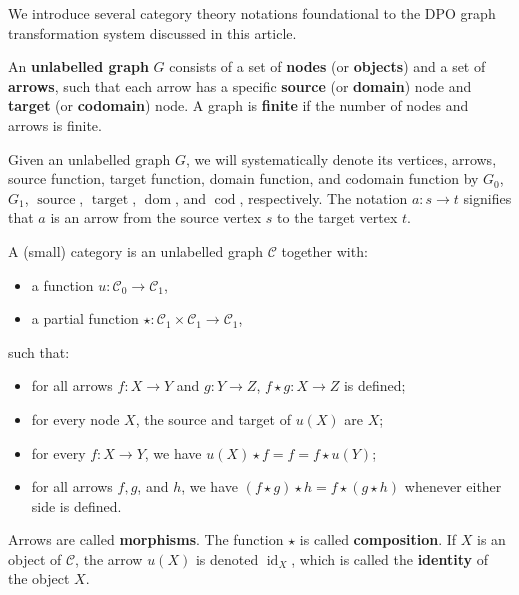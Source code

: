  We introduce several category theory notations foundational to the DPO graph transformation system discussed in this article.

\begin{definition} 
    An \textbf{unlabelled graph} \(G\) consists of a set of \textbf{nodes} (or \textbf{objects}) and a set of \textbf{arrows}, such that each arrow has a specific \textbf{source} (or \textbf{domain}) node and \textbf{target} (or \textbf{codomain}) node. A graph is \textbf{finite} if the number of nodes and arrows is finite.

    Given an unlabelled graph \(G\), we will systematically denote its vertices, arrows, source function, target function, domain function, and codomain function by \(G_0\), \(G_1\), \(\operatorname{source}\), \(\operatorname{target}\), \(\operatorname{dom}\), and \(\operatorname{cod}\), respectively. The notation \(a: s \mathop{\to} t\) signifies that \(a\) is an arrow from the source vertex \(s\) to the target vertex \(t\).
\end{definition}

\begin{definition}
    A (small) category is an unlabelled graph \(\mathcal{C}\) together with:
    \begin{itemize}
        \item a function \(u : \mathcal{C}_0 \mathop{\to} \mathcal{C}_1\),
        \item a partial function \(\star : \mathcal{C}_1 \mathop{\times} \mathcal{C}_1 \mathop{\to} \mathcal{C}_1\),
    \end{itemize}
    such that:
    \begin{itemize}
        \item for all arrows \(f:X \mathop{\rightarrow} Y\) and \(g:Y \mathop{\rightarrow} Z\), \(f \mathop{\star} g :X \mathop{\to} Z\) is defined;
        \item for every node \(X\), the source and target of \(u(X)\) are \(X\);
        \item for every \(f:X \mathop{\rightarrow} Y\), we have \(u(X) \mathop{\star} f \mathop{=} f \mathop{=} f \mathop{\star} u(Y)\);
        \item for all arrows \(f, g\), and \(h\), we have \((f \mathop{\star} g) \mathop{\star} h \mathop{=} f \mathop{\star} (g \mathop{\star} h)\) whenever either side is defined.
    \end{itemize}
 
    Arrows are called \textbf{morphisms}. The function $\star$ is called \textbf{composition}. If $X$ is an object of $\mathcal{C}$, the arrow $u(X)$ is denoted $\operatorname{id}_X$, which is called the \textbf{identity} of the object $X$. 
\end{definition}

